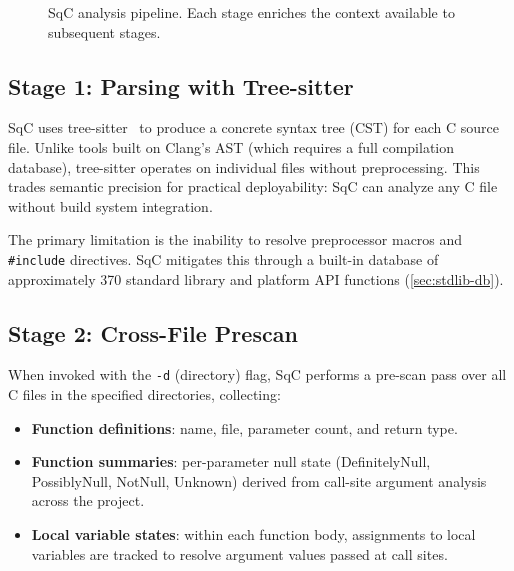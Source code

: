 \documentclass[10pt,twocolumn,letterpaper]{article}
\begin{document}
\begin{figure}[t]
\centering
{}
\caption{SqC analysis pipeline.  Each stage enriches the context
available to subsequent stages.}
\label{fig:pipeline}
\end{figure}

\subsection{Stage 1: Parsing with Tree-sitter}

SqC uses tree-sitter~\cite{tree-sitter} to produce a concrete syntax
tree (CST) for each C source file.  Unlike tools built on Clang's AST
(which requires a full compilation database), tree-sitter operates on
individual files without preprocessing.  This trades semantic precision
for practical deployability: SqC can analyze any C file without build
system integration.

The primary limitation is the inability to resolve preprocessor macros
and \texttt{\#include} directives.  SqC mitigates this through a
built-in database of approximately 370 standard library and platform
API functions (\cref{sec:stdlib-db}).

\subsection{Stage 2: Cross-File Prescan}
\label{sec:prescan}

When invoked with the \texttt{-d} (directory) flag, SqC performs a
pre-scan pass over all C files in the specified directories, collecting:

\begin{itemize}
    \item \textbf{Function definitions}: name, file, parameter count,
        and return type.
    \item \textbf{Function summaries}: per-parameter null state
        (DefinitelyNull, PossiblyNull, NotNull, Unknown) derived from
        call-site argument analysis across the project.
    \item \textbf{Local variable states}: within each function body,
        assignments to local variables are tracked to resolve argument
        values passed at call sites.
\end{itemize}
\end{document}
